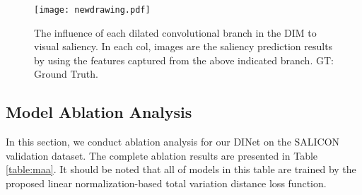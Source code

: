 \begin{figure}[h]
	\centering
	\scriptsize
	\texttt{[image: newdrawing.pdf]}
	\caption{
The influence of each dilated convolutional branch in the DIM to visual saliency. In each col, images are the saliency prediction results by using the features captured from the above indicated branch. GT: Ground Truth.
	}
	\label{fig:inc2}
\end{figure}


\subsection{Model Ablation Analysis} 
In this section, we conduct ablation analysis for our DINet on the SALICON validation dataset. The complete ablation results are presented in Table \ref{table:maa}. It should be noted that all of models in this table are trained by the proposed linear normalization-based total variation distance loss function.


